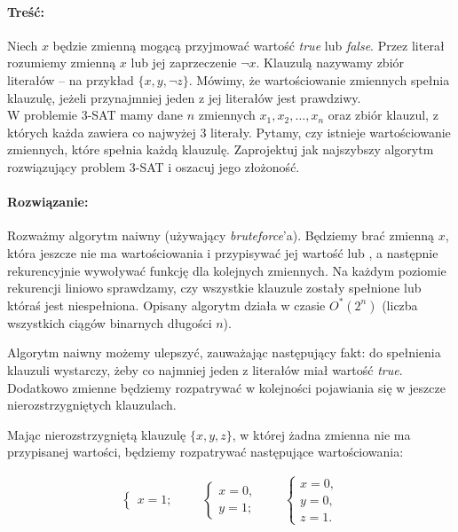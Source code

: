 \paragraph{Treść: } Niech $x$ będzie zmienną mogącą przyjmować wartość \textit{true} lub \textit{false}. Przez literał rozumiemy zmienną
$x$ lub jej zaprzeczenie $\lnot x$. Klauzulą nazywamy zbiór literałów -- na przykład $\{x, y, \lnot z\}$. Mówimy, że wartościowanie
zmiennych spełnia klauzulę, jeżeli przynajmniej jeden z jej literałów jest prawdziwy.
\\ W problemie 3-SAT mamy dane $n$ zmiennych $x_1, x_2, \ldots, x_n$ oraz zbiór klauzul, z których każda zawiera co najwyżej
3 literały. Pytamy, czy istnieje wartościowanie zmiennych, które spełnia każdą klauzulę.
Zaprojektuj jak najszybszy algorytm rozwiązujący problem 3-SAT i oszacuj jego złożoność.

\paragraph{Rozwiązanie: } Rozważmy algorytm naiwny (używający \textit{bruteforce}'a). Będziemy brać zmienną $x$, która jeszcze nie ma wartościowania i przypisywać jej wartość \true{} lub \false, a następnie rekurencyjnie wywoływać funkcję dla kolejnych zmiennych. Na każdym poziomie rekurencji liniowo sprawdzamy, czy wszystkie klauzule zostały spełnione lub któraś jest niespełniona. Opisany algorytm działa w czasie $O^*(2^n)$ (liczba wszystkich ciągów binarnych długości $n$).


Algorytm naiwny możemy ulepszyć, zauważając następujący fakt: do spełnienia klauzuli wystarczy, żeby co najmniej jeden z literałów miał wartość \textit{true}. Dodatkowo zmienne będziemy rozpatrywać w kolejności pojawiania się w jeszcze nierozstrzygniętych klauzulach.

Mając nierozstrzygniętą klauzulę $\{x, y, z\}$, w której żadna zmienna nie ma przypisanej wartości, będziemy rozpatrywać następujące wartościowania:

\begin{align*}
	\begin{cases}
		x = 1;
	\end{cases}
	\qquad
	\begin{cases}
		x = 0, \\
		y = 1;
	\end{cases}
	\qquad
	\begin{cases}
		x = 0, \\
		y = 0,\\
		z = 1.
	\end{cases}
\end{align*}

